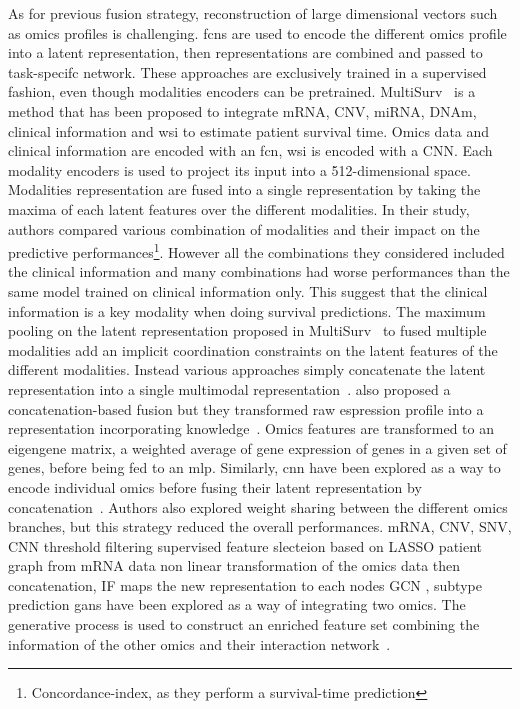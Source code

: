\documentclass[../main.tex]{subfiles}
\begin{document}
			As for previous fusion strategy, reconstruction of large dimensional vectors such as omics profiles is challenging.
			\Glspl{fcn} are used to encode the different omics profile into a latent representation, then representations are combined and passed to task-specifc network. 
			These approaches are exclusively trained in a supervised fashion, even though modalities encoders can be pretrained. 
			MultiSurv~\cite{MultiSurv} is a method that has been proposed to integrate mRNA, CNV, miRNA, DNAm, clinical information and \gls{wsi} to estimate patient survival time.
			Omics data and clinical information are encoded with an \gls{fcn}, \gls{wsi} is encoded with a CNN. 
			Each modality encoders is used to project its input into a 512-dimensional space. 
			Modalities representation are fused into a single representation by taking the maxima of each latent features over the different modalities. 
			In their study, authors compared various combination of modalities and their impact on the predictive performances\footnote{Concordance-index, as they perform a survival-time prediction}. 
			However all the combinations they considered included the clinical information and many combinations had worse performances than the same model trained on clinical information only. 
			This suggest that the clinical information is a key modality when doing survival predictions. 
			The maximum pooling on the latent representation proposed in MultiSurv~\cite{MultiSurv} to fused multiple modalities add an implicit coordination constraints on the latent features of the different modalities. 
			Instead various approaches simply concatenate the latent representation into a single multimodal representation~\cite{MOLI,Lin2020}.
			\citeauthor{SALMON} also proposed a concatenation-based fusion but they transformed raw espression profile into a representation incorporating knowledge~\cite{SALMON}.
			Omics features are transformed to an eigengene matrix, a weighted average of gene expression of genes in a given set of genes, before being fed to an \gls{mlp}.
			Similarly, \gls{cnn} have been explored as a way to encode individual omics before fusing their latent representation by concatenation~\cite{MohaiminulIslam2020}. 
			Authors also explored weight sharing between the different omics branches, but this strategy reduced the overall performances.
			\cite{Yin2022} mRNA, CNV, SNV, CNN
			threshold filtering
			supervised feature slecteion based on LASSO
			patient graph from mRNA data
			non linear transformation of the omics data then concatenation, IF
			maps the new representation to each nodes
			GCN , subtype prediction
			\Glspl{gan} have been explored as a way of integrating two omics.
			The generative process is used to construct an enriched feature set combining the information of the other omics and their interaction network~\cite{omicsGAN}.
\end{document}
